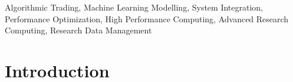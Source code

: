 \documentclass[conference]{IEEEtran}
\begin{document}
\begin{abstract}

\end{abstract}

\begin{IEEEkeywords}
Algorithmic Trading, Machine Learning Modelling, System Integration, Performance Optimization, High Performance Computing, Advanced Research Computing, Research Data Management
\end{IEEEkeywords}

\section{Introduction}

\end{document}
